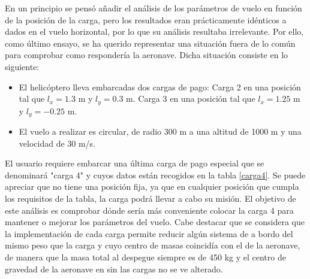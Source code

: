 En un principio se pensó añadir el análisis de los parámetros de vuelo en función de la posición de la carga, pero los resultados eran prácticamente idénticos a dados en el vuelo horizontal, por lo que su análisis resultaba irrelevante.
Por ello, como último ensayo, se ha querido representar una situación fuera de lo común para comprobar como respondería la aeronave. Dicha situación consiste en lo siguiente:

\begin{itemize}
	\item El helicóptero lleva embarcadas dos cargas de pago:
	\subitem Carga 2 en una posición tal que $l_x=1.3$ m y $l_y=0.3$ m.
	\subitem Carga 3 en una posición tal que $l_x=1.25$ m y $l_y=-0.25$ m.
	\item El vuelo a realizar es circular, de radio 300 m a una altitud de 1000 m y una velocidad de 30 m/s.
\end{itemize}
El usuario requiere embarcar una última carga de pago especial que se denominará "carga 4" y cuyos datos están recogidos en la tabla \ref{carga4}. Se puede apreciar que no tiene una posición fija, ya que en cualquier posición que cumpla los requisitos de la tabla, la carga podrá llevar a cabo su misión.
El objetivo de este análisis es comprobar dónde sería más conveniente colocar la carga 4 para mantener o mejorar los parámetros del vuelo.
Cabe destacar que se considera que la implementación de cada carga permite reducir algún sistema de a bordo del mismo peso que la carga y cuyo centro de masas coincidía con el de la aeronave, de manera que la masa total al despegue siempre es de 450 kg y el centro de gravedad de la aeronave en sin las cargas no se ve alterado.

